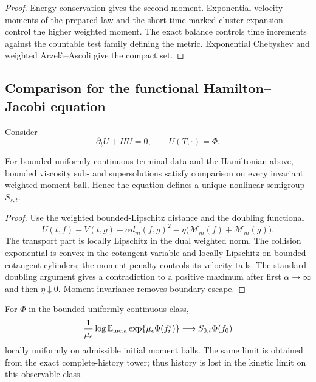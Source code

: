 \begin{proof}
Energy conservation gives the second moment.  Exponential velocity moments
of the prepared law and the short-time marked cluster expansion control the
higher weighted moment.  The exact balance controls time increments against
the countable test family defining the metric.  Exponential Chebyshev and
weighted Arzel\`a--Ascoli give the compact set.
\end{proof}

\subsection{Comparison for the functional Hamilton--Jacobi equation}

Consider
\[
 \partial_tU+HU=0,\qquad U(T,\cdot)=\Phi.
\]

\begin{theorem}
\label{thm:rr2-b4-comparison}
For bounded uniformly continuous terminal data and the Hamiltonian above,
bounded viscosity sub- and supersolutions satisfy comparison on every
invariant weighted moment ball.  Hence the equation defines a unique
nonlinear semigroup \(S_{s,t}\).
\end{theorem}

\begin{proof}
Use the weighted bounded-Lipschitz distance and the doubling functional
\[
 U(t,f)-V(t,g)-\alpha d_m(f,g)^2-\eta
 \big(\mathcal M_m(f)+\mathcal M_m(g)\big).
\]
The transport part is locally Lipschitz in the dual weighted norm.  The
collision exponential is convex in the cotangent variable and locally
Lipschitz on bounded cotangent cylinders; the moment penalty controls its
velocity tails.  The standard doubling argument gives a contradiction to a
positive maximum after first \(\alpha\to\infty\) and then \(\eta\downarrow0\).
Moment invariance removes boundary escape.
\end{proof}

\begin{theorem}
\label{thm:rr2-b4-semigroup}
For \(\Phi\) in the bounded uniformly continuous class,
\[
 \frac1{\mu_\epsilon}\log
 \mathbb E_{\rm mc,a}
 \exp\{\mu_\epsilon\Phi(f_t^\epsilon)\}
 \longrightarrow
 S_{0,t}\Phi(f_0)
\]
locally uniformly on admissible initial moment balls.  The same limit is
obtained from the exact complete-history tower; thus history is lost in the
kinetic limit on this observable class.
\end{theorem}

